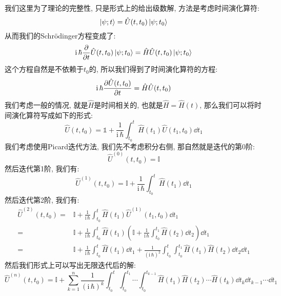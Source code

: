 我们这里为了理论的完整性, 只是形式上的给出级数解, 方法是考虑时间演化算符:
\begin{equation}
  \ket{\psi;t} = \hat{U}(t,t_0) \ket{\psi;t_0}
\end{equation}
从而我们的Schrödinger方程变成了:
\begin{equation}
  \mathrm{i}\, \hbar \pdv{}{t}\hat{U}(t,t_0)\ket{\psi;t_0} = \hat{H} \hat{U}(t,t_0) \ket{\psi;t_0}
\end{equation}
这个方程自然是不依赖于$t_0$的, 所以我们得到了时间演化算符的方程:
\begin{equation}
  \mathrm{i}\, \hbar \pdv{\hat{U}(t,t_0)}{t} = \hat{H} \hat{U}(t,t_0)
\end{equation}
我们考虑一般的情况, 就是$\hat{H}$是时间相关的, 也就是$\hat{H} = \hat{H}(t)$, 那么我们可以将时间演化算符写成如下的形式:
\begin{equation}
  \hat{U}(t,t_0) = \mathbb{1} + \frac{1}{\mathrm{i}\, \hbar} \int_{t_0}^{t} \hat{H}(t_1) \hat{U}(t_1,t_0) \dd{t_1}
\end{equation}
我们考虑使用Picard迭代方法, 我们先不考虑积分右侧, 那自然就是迭代的第0阶:
\begin{equation}
  \hat{U}^{(0)}(t,t_0) = \mathbb{I}
\end{equation}
然后迭代第1阶, 我们有:
\begin{equation}
  \hat{U}^{(1)}(t,t_0) = \mathbb{I} + \frac{1}{\mathrm{i}\, \hbar} \int_{t_0}^{t} \hat{H}(t_1) \dd{t_1}
\end{equation}
然后迭代第2阶, 我们有:
\begin{align}
  \hat{U}^{(2)}(t,t_0) =& \mathbb{I} + \frac{1}{\mathrm{i}\, \hbar} \int_{t_0}^{t} \hat{H}(t_1) \hat{U}^{(1)}(t_1,t_0) \dd{t_1} \\
  =& \mathbb{I} + \frac{1}{\mathrm{i}\, \hbar} \int_{t_0}^{t} \hat{H}(t_1) \left( \mathbb{I} + \frac{1}{\mathrm{i}\, \hbar} \int_{t_0}^{t_1} \hat{H}(t_2) \dd{t_2} \right) \dd{t_1} \\
  =& \mathbb{I} + \frac{1}{\mathrm{i}\, \hbar} \int_{t_0}^{t} \hat{H}(t_1) \dd{t_1} + \frac{1}{(\mathrm{i}\, \hbar)^2} \int_{t_0}^{t} \int_{t_0}^{t_1} \hat{H}(t_1) \hat{H}(t_2) \dd{t_2} \dd{t_1}
\end{align}
然后我们形式上可以写出无限迭代后的解:
\begin{equation}
  \hat{U}^{(n)}(t,t_0) = \mathbb{I} + \sum_{k=1}^{n} \frac{1}{(\mathrm{i}\, \hbar)^k} \int_{t_0}^{t} \int_{t_0}^{t_1} \cdots \int_{t_0}^{t_{k-1}} \hat{H}(t_1) \hat{H}(t_2) \cdots \hat{H}(t_k) \dd{t_k} \dd{t_{k-1}} \cdots \dd{t_1}
\end{equation}
